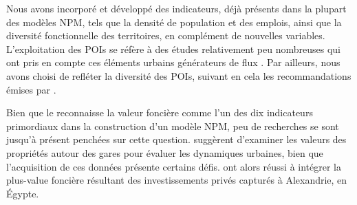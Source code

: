 \begin{refsegment}
Nous avons incorporé et développé des indicateurs, déjà présents dans la plupart des modèles \acrshort{NPM}, tels que la densité de population et des emplois, ainsi que la diversité fonctionnelle des territoires, en complément de nouvelles variables. L'exploitation des \acrshort{POIs} se réfère à des études relativement peu nombreuses qui ont pris en compte ces éléments urbains générateurs de flux \textcolor{blue}{\autocites[82]{robillard_transit-oriented_2024}[2]{zhou_introducing_2023}}. Par ailleurs, nous avons choisi de refléter la diversité des \acrshort{POIs}, suivant en cela les recommandations émises par \textcolor{blue}{\textcite[7]{zhang_make_2023}}.%

Bien que le \textcolor{blue}{\textcite{transportation_research_board_of_the_national_academies_transit_2007}} reconnaisse la valeur foncière comme l'un des dix indicateurs primordiaux dans la construction d'un modèle \acrshort{NPM}, peu de recherches se sont jusqu'à présent penchées sur cette question. \textcolor{blue}{\textcite[135]{kim_geographic_2018}} suggèrent d'examiner les valeurs des propriétés autour des gares pour évaluer les dynamiques urbaines, bien que l'acquisition de ces données présente certains défis. \textcolor{blue}{\textcite[242]{ibrahim_measuring_2023}} ont alors réussi à intégrer la plus-value foncière résultant des investissements privés capturés à Alexandrie, en Égypte. %


\end{refsegment}
